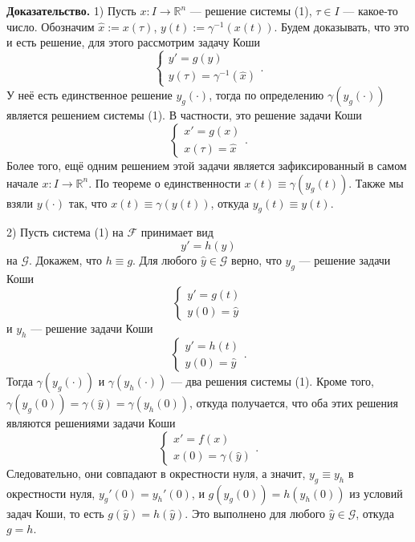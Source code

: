 \textbf{Доказательство.} 1) Пусть $x: I \to \mathbb R^n$ --- решение системы (1), $\tau \in I$ --- какое-то число.
Обозначим $\widehat x := x(\tau)$, $y(t) := \gamma^{-1}(x(t))$.
Будем доказывать, что это и есть решение, для этого рассмотрим задачу Коши
\[
    \begin{cases}
        y' = g(y) \\
        y(\tau) = \gamma^{-1}(\widehat x)
    \end{cases}.
\]
У неё есть единственное решение $y_g(\cdot)$, тогда по определению $\gamma(y_g(\cdot))$ является решением системы (1).
В частности, это решение задачи Коши
\[
    \begin{cases}
        x' = g(x) \\
        x(\tau) = \widehat x
    \end{cases}.
\]
Более того, ещё одним решением этой задачи является зафиксированный в самом начале $x: I \to \mathbb R^n$.
По теореме о единственности $x(t) \equiv \gamma(y_g(t))$.
Также мы взяли $y(\cdot)$ так, что $x(t) \equiv \gamma(y(t))$, откуда $y_g(t) \equiv y(t)$.

2) Пусть система (1) на $\mathcal F$ принимает вид
\begin{equation}
    y' = h(y)
\end{equation}
на $\mathcal G$. Докажем, что $h \equiv g$.
Для любого $\widehat y \in \mathcal G$ верно, что $y_g$ --- решение задачи Коши
\[
    \begin{cases}
        y' = g(t) \\
        y(0) = \widehat y
    \end{cases}
\]
и $y_h$ --- решение задачи Коши
\[
    \begin{cases}
        y' = h(t) \\
        y(0) = \widehat y
    \end{cases}.
\]
Тогда $\gamma(y_g(\cdot))$ и $\gamma(y_h(\cdot))$ --- два решения системы (1).
Кроме того, $\gamma(y_g(0)) = \gamma(\widehat y) = \gamma(y_h(0))$, откуда получается, что оба этих решения являются решениями задачи Коши
\[
    \begin{cases}
        x' = f(x) \\
        x(0) = \gamma(\widehat y)
    \end{cases}.
\]
Следовательно, они совпадают в окрестности нуля, а значит, $y_g \equiv y_h$ в окрестности нуля, $y_g'(0) = y_h'(0)$, и $g(y_g(0)) = h(y_h(0))$ из условий задач Коши, то есть $g(\widehat y) = h(\widehat y)$.
Это выполнено для любого $\widehat y \in \mathcal G$, откуда $g = h$.

